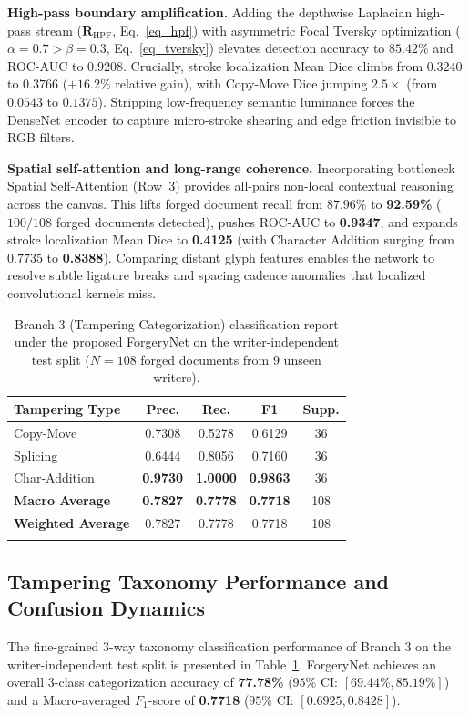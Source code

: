 \documentclass[pdflatex,sn-mathphys-num,iicol]{sn-jnl}
\begin{document}
\noindent
\textbf{High-pass boundary amplification.} Adding the depthwise Laplacian high-pass stream ($\mathbf{R}_{\text{HPF}}$, Eq.~\ref{eq_hpf}) with asymmetric Focal Tversky optimization ($\alpha = 0.7 > \beta = 0.3$, Eq.~\ref{eq_tversky}) elevates detection accuracy to $85.42\%$ and ROC-AUC to $0.9208$. Crucially, stroke localization Mean Dice climbs from $0.3240$ to \textbf{$0.3766$} ($+16.2\%$ relative gain), with Copy-Move Dice jumping $2.5\times$ (from $0.0543$ to $0.1375$). Stripping low-frequency semantic luminance forces the DenseNet encoder to capture micro-stroke shearing and edge friction invisible to RGB filters.

\noindent
\textbf{Spatial self-attention and long-range coherence.} Incorporating bottleneck Spatial Self-Attention (Row~3) provides all-pairs non-local contextual reasoning across the canvas. This lifts forged document recall from $87.96\%$ to \textbf{92.59\%} ($100/108$ forged documents detected), pushes ROC-AUC to \textbf{0.9347}, and expands stroke localization Mean Dice to \textbf{0.4125} (with Character Addition surging from $0.7735$ to \textbf{0.8388}). Comparing distant glyph features enables the network to resolve subtle ligature breaks and spacing cadence anomalies that localized convolutional kernels miss.

\begin{table}[t]
\caption{Branch 3 (Tampering Categorization) classification report under the proposed ForgeryNet on the writer-independent test split ($N = 108$ forged documents from 9 unseen writers).}\label{tab_type}
\setlength{\tabcolsep}{2.5pt}
\begin{tabular*}{\columnwidth}{@{\extracolsep\fill}lcccc@{}}
\toprule
\textbf{Tampering Type} & \textbf{Prec.} & \textbf{Rec.} & \textbf{F1} & \textbf{Supp.} \\
\midrule
Copy-Move           & 0.7308 & 0.5278 & 0.6129 & 36 \\
Splicing            & 0.6444 & 0.8056 & 0.7160 & 36 \\
Char-Addition       & \textbf{0.9730} & \textbf{1.0000} & \textbf{0.9863} & 36 \\
\midrule
\textbf{Macro Average}      & \textbf{0.7827} & \textbf{0.7778} & \textbf{0.7718} & 108 \\
\textbf{Weighted Average}   & 0.7827 & 0.7778 & 0.7718 & 108 \\
\botrule
\end{tabular*}
\end{table}

\subsection{Tampering Taxonomy Performance and Confusion Dynamics}\label{subsec5_5}
The fine-grained 3-way taxonomy classification performance of Branch 3 on the writer-independent test split is presented in Table~\ref{tab_type}. ForgeryNet achieves an overall 3-class categorization accuracy of \textbf{77.78\%} ($95\%$ CI: $[69.44\%, 85.19\%]$) and a Macro-averaged $F_1$-score of \textbf{0.7718} ($95\%$ CI: $[0.6925, 0.8428]$). 
\end{document}
